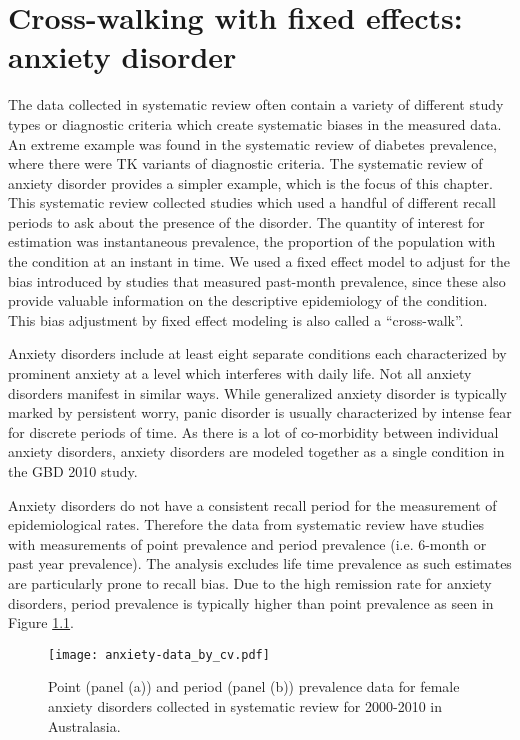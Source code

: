 \chapter{Cross-walking with fixed effects: anxiety disorder}
\label{applications-efx_study_level}

The data collected in systematic review often contain a variety of
different study types or diagnostic criteria which create systematic
biases in the measured data.  An extreme example was found in the
systematic review of diabetes prevalence, where there were TK variants
of diagnostic criteria.  The systematic review of anxiety disorder
provides a simpler example, which is the focus of this chapter. This
systematic review collected studies which used a handful of different
recall periods to ask about the presence of the disorder. The quantity
of interest for estimation was instantaneous prevalence, the
proportion of the population with the condition at an instant in time.
We used a fixed effect model to adjust for the bias introduced by
studies that measured past-month prevalence, since these also provide
valuable information on the descriptive epidemiology of the condition.
This bias adjustment by fixed effect modeling is also called a
``cross-walk''.

Anxiety disorders include at least eight separate conditions each
characterized by prominent anxiety at a level which interferes with
daily life.  Not all anxiety disorders manifest in similar ways.
While generalized anxiety disorder is typically marked by persistent
worry, panic disorder is usually characterized by intense fear for
discrete periods of time. \cite{association_diagnostic_2000} As there is
a lot of co-morbidity between individual anxiety disorders, anxiety
disorders are modeled together as a single condition in the GBD 2010
study.

Anxiety disorders do not have a consistent recall period for the
measurement of epidemiological rates.  Therefore the data from
systematic review have studies with measurements of point prevalence
and period prevalence (i.e. 6-month or past year prevalence).  The
analysis excludes life time prevalence as such estimates are
particularly prone to recall bias.  Due to the high remission rate for
anxiety disorders, period prevalence is typically higher than point
prevalence as seen in Figure \ref{fig:app-anxiety data}.

    \begin{figure}[h]
        \begin{center}
            \texttt{[image: anxiety-data\_by\_cv.pdf]}
            \caption{Point (panel (a)) and period (panel (b)) prevalence data 
              for female anxiety disorders collected in systematic review for
              2000-2010 in Australasia.}
            \label{fig:app-anxiety data}
        \end{center}
    \end{figure}

